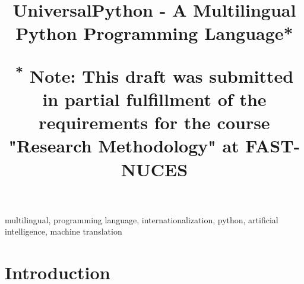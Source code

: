 \documentclass[conference]{IEEEtran}
\begin{document}
\title{UniversalPython - A Multilingual Python Programming Language*\\
{\footnotesize \textsuperscript{*}
Note: This draft was submitted in partial fulfillment of the requirements for the course "Research Methodology"
at FAST-NUCES

}
}

\author{
}

\maketitle

\begin{abstract}
\end{abstract}

\begin{IEEEkeywords}
multilingual, programming language, internationalization, python, artificial intelligence, machine translation
\end{IEEEkeywords}

\section{Introduction}

\end{document}
